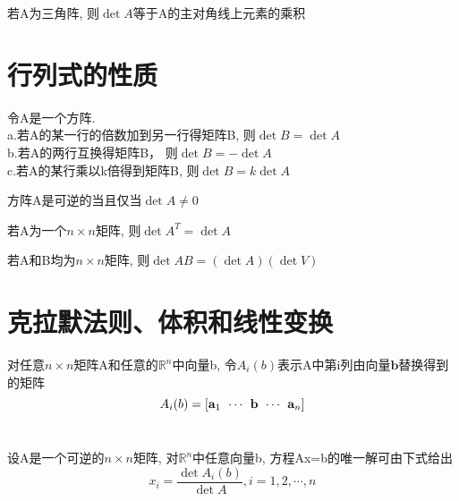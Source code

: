 \begin{TheoremOne}
若A为三角阵, 则$\det A$等于A的主对角线上元素的乘积
\end{TheoremOne}\vspace{8ex}

\section{行列式的性质}
\begin{TheoremTwo}[行变换]
令A是一个方阵.\\
a.若A的某一行的倍数加到另一行得矩阵B, 则$\det B=\det A$\\
b.若A的两行互换得矩阵B， 则$\det B=-\det A$\\
c.若A的某行乘以k倍得到矩阵B, 则$\det B=k\det A$
\end{TheoremTwo}\vspace{4ex}

\begin{TheoremOne}
方阵A是可逆的当且仅当$\det A\neq0$
\end{TheoremOne}\vspace{4ex}

\begin{TheoremOne}
若A为一个$n\times n$矩阵, 则$\det A^T=\det A$
\end{TheoremOne}\vspace{4ex}

\begin{TheoremTwo}[乘法的性质]
若A和B均为$n\times n$矩阵, 则$\det AB=(\det A)(\det V)$
\end{TheoremTwo}\vspace{8ex}

\section{克拉默法则、体积和线性变换}
对任意$n\times n$矩阵A和任意的$\mathbb{R}^n$中向量b, 令$A_i(b)$表示A中第i列由向量$\mathbf{b}$替换得到的矩阵
\[A_i(b)=[\mathbf{a}_1\hspace{1ex}\cdots\hspace{1ex}\mathbf{b}\hspace{1ex}\cdots\hspace{1ex}\mathbf{a}_n]\]\\[-1ex]

\begin{TheoremTwo}[克拉默法则]
设A是一个可逆的$n\times n$矩阵, 对$\mathbb{R}^n$中任意向量b, 方程Ax=b的唯一解可由下式给出
\[x_i=\frac{\det A_i(b)}{\det A},i=1,2,\cdots,n\]
\end{TheoremTwo}\vspace{4ex}

